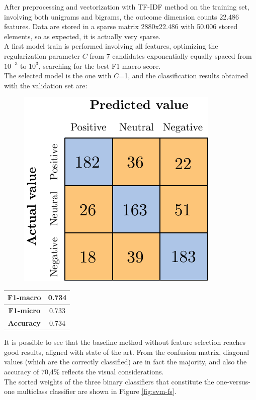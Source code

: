 After preprocessing and vectorization with TF-IDF method on the training set, involving both unigrams and bigrams, the outcome dimension counts 22.486 features. Data are stored in a sparse matrix 2880x22.486 with 50.006 stored elements, so as expected, it is actually very sparse.\\
A first model train is performed involving all features, optimizing the regularization parameter $C$ from 7 candidates exponentially equally spaced from $10^{-3}$ to $10^3$, searching for the best F1-macro score.\\
The selected model is the one with $C$=1, and the classification results obtained with the validation set are:

\begin{figure}[ht]
	\centering
	\includegraphics[scale=1]{figures/conf_matrices/twitter_snt_svm/twitter_snt_svm_bfs.pdf}
	\label{fig:tw_snt_svm_bfs}
\end{figure}

\begin{center}
	\begin{tabular}{ | c | c | } 
		\hline
		\textbf{F1-macro} & 0.734 \\
		\hline
		\textbf{F1-micro} & 0.733 \\ 
		\hline
		\textbf{Accuracy} & 0.734 \\ 
		\hline
	\end{tabular}
\end{center}

It is possible to see that the baseline method without feature selection reaches good results, aligned with state of the art. From the confusion matrix, diagonal values (which are the correctly classified) are in fact the majority, and also the accuracy of 70,4\% reflects the visual considerations.\\
The sorted weights of the three binary classifiers that constitute the one-versus-one multiclass classifier are shown in Figure \ref{fig:svm-fs}.

